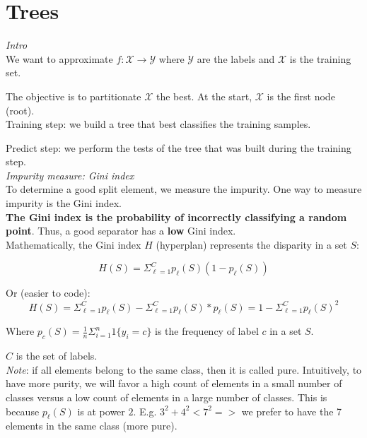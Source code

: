 \section*{Trees}

\label{sec:trees}

\vspace{5mm}

\textit{Intro} \\

We want to approximate $f: \mathcal{X} \to \mathcal{Y}$ where $\mathcal{Y}$ are the labels and $\mathcal{X}$ is the training set.

The objective is to partitionate $\mathcal{X}$ the best. At the start, $\mathcal{X}$ is the first node (root). \\

Training step: we build a tree that best classifies the training samples.

Predict step: we perform the tests of the tree that was built during the training step. \\

\textit{Impurity measure: Gini index} \\

To determine a good split element, we measure the impurity. One way to measure impurity is the Gini index. \\

\textbf{The Gini index is the probability of incorrectly classifying a random point}. Thus, a good separator has a \textbf{low} Gini index. \\

Mathematically, the Gini index $H$ (hyperplan) represents the disparity in a set $S$:

$$H(S)=\Sigma_{\ell=1}^C p_{\ell}(S)(1-p_{\ell}(S))$$

Or (easier to code): 
$$H(S)=\Sigma_{\ell=1}^C p_{\ell}(S)-\Sigma_{\ell=1}^C p_{\ell}(S)*p_{\ell}(S)=1-\Sigma_{\ell=1}^C p_{\ell}(S)^2$$

Where $p_{c}(S)=\frac{1}{n}\Sigma_{i=1}^n 1\{y_i=c\}$ is the frequency of label $c$ in a set $S$.

$C$ is the set of labels. \\

\textit{Note}: if all elements belong to the same class, then it is called pure. Intuitively, to have more purity, we will favor a high count of elements in a small number of classes versus a low count of elements in a large number of classes. This is because $p_{\ell}(S)$ is at power $2$. E.g. $3^2 + 4^2 < 7^2 =>$ we prefer to have the 7 elements in the same class (more pure).\\


